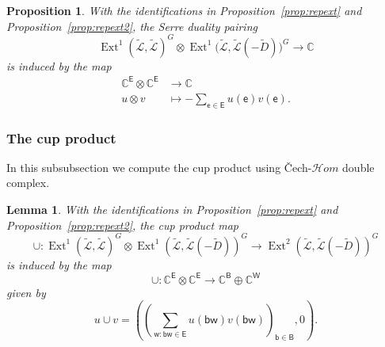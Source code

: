 \documentclass[dvipsnames,11pt]{article}
\newtheorem{lemma}[theorem]{Lemma}
\newtheorem{proposition}[theorem]{Proposition}
\theoremstyle{definition}
\newcommand{\C}{{\mathbb C}}
\def\B{\mathsf B}
\def\W{\mathsf W}
\def\w{\mathsf w}
\def\b{\mathsf b}
\def\e{\mathsf e}
\def\E{\mathsf E}
\def\Ext{\operatorname{Ext}}
\newcommand{\la}{\label}
\def\Ext{\operatorname{Ext}}
\begin{document}
\begin{proposition}\la{prop:gsdual}
With the identifications in Proposition~\ref{prop:repext} and Proposition~\ref{prop:repext2}, the Serre duality pairing
\[
\Ext^1(\widetilde{\mathcal L},\widetilde{\mathcal L})^G
\otimes
\Ext^{1}\!\bigl(\widetilde{\mathcal L},\widetilde{\mathcal L}(-\widetilde D)\bigr)^G
\rightarrow \C
\]
is induced by the map
\begin{align}
\C^\E \otimes \C^\E &\rightarrow \C \nonumber\\
u\otimes v &\mapsto -\sum_{\e\in\E}u(\e)v(\e).
\la{eq:gsd}
\end{align}
\end{proposition}

\subsubsection{The cup product}

In this subsubsection we compute the cup product using \v{C}ech-$\mathcal Hom$ double complex.

\begin{lemma}\la{lem::cup1}
With the identifications in Proposition~\ref{prop:repext} and Proposition~\ref{prop:repext2}, the cup product map
\[
\cup:
\Ext^1(\widetilde{\mathcal L},\widetilde{\mathcal L})^G \otimes
\Ext^1(\widetilde{\mathcal L},\widetilde{\mathcal L}(-\widetilde D))^G
\rightarrow
\Ext^2(\widetilde{\mathcal L},\widetilde{\mathcal L}(-\widetilde D))^G
\]
is induced by the map
\[
\cup: \C^\E\otimes \C^\E \rightarrow \C^\B\oplus \C^\W
\]
given by
\[
u \cup v
=
\left(
\left(\sum_{\w:\b\w\in \E} u(\b\w)v(\b\w)\right)_{\b\in \B},
0
\right).
\]
\end{lemma}
\end{document}
